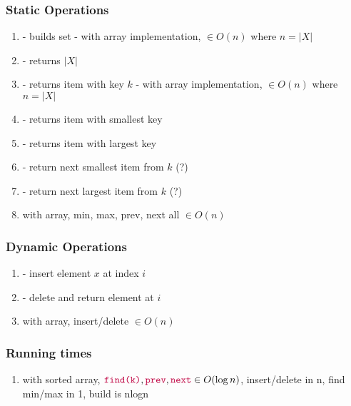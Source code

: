 \documentclass{article}
\begin{document}
        \subsubsection{Static Operations}
            \begin{enumerate}
                \item {} - builds set
                    \subitem - with array implementation,  $\in O(n)$ where $n = |X|$
                \item {} - returns $|X|$
                \item {} - returns item with key $k$
                    \subitem - with array implementation,  $\in O(n)$ where $n = |X|$
                \item {} - returns item with smallest key
                \item {} - returns item with largest key
                \item {} - return next smallest item from $k$ (?)
                \item {} - return next largest item from $k$ (?)
                \item with array, min, max, prev, next all $\in O(n)$
    
            \end{enumerate}
        \subsubsection{Dynamic Operations}
            \begin{enumerate}
                \item {} - insert element $x$ at index $i$
                \item {} - delete and return element at $i$
                \item with array, insert/delete $\in O(n)$
            \end{enumerate}
        \subsubsection{Running times}
            \begin{enumerate}
                \item with sorted array, $\texttt{\textcolor{purple}{find(k)}}, \texttt{\textcolor{purple}{prev}}, \texttt{\textcolor{purple}{next}} \in O(\log n)$, insert/delete in n, find min/max in 1, build is nlogn
            \end{enumerate}
\end{document}

